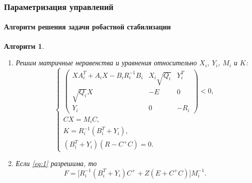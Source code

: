 \documentclass[ignorenonframetext,hyperref={pdftex,unicode},compress,handout]{beamer}
\newtheorem{alg}{Алгоритм}
\begin{document}
\begin{frame}
    \frametitle{Параметризация управлений}
    \framesubtitle{Алгоритм решения задачи робастной стабилизации}
    \small
    \begin{alg}
        \begin{enumerate}
            \item
            \par Решим матричные неравенства и уравнения относительно $X_i$, $Y_i$, $M_i$ и $K$:
            \begin{equation}
            \label{eq:1}
                \left\{
                    \begin{array}{l}
                        \left(
                            \begin{array}{ccc}
                                XA_i^T + A_iX - B_iR_i^{-1}B_i   &   X_i\sqrt{Q_i}   &   Y_i^T   \\
                                \sqrt{Q_i}X   &   -E   &   0 \\
                                Y_i   &   0   &   -R_i
                            \end{array}
                        \right) < 0\mbox{,} \\
                        CX = M_iC\mbox{,} \\
                        K = R_i^{-1}(B_i^T + Y_i)\mbox{,} \\
                        (B_i^T + Y_i)(R - C^+C) = 0\mbox{.}
                    \end{array}
                \right.
            \end{equation}

            \item
            \par Если \ref{eq:1} разрешима, то
            \begin{equation}
                F = \big[ R_i^{-1}(B_i^T + Y_i)C^+ + Z(E + C^+C) \big]M_i^{-1}\mbox{.}
            \end{equation}
        \end{enumerate}
    \end{alg}
\end{frame}
\end{document}

